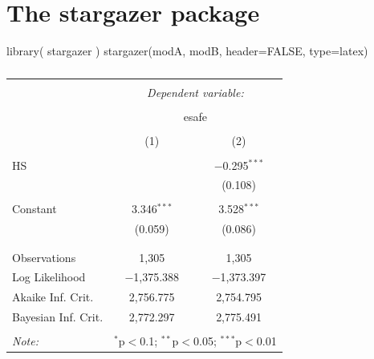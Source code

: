 \documentclass[
  letterpaper,
  DIV=11,
  numbers=noendperiod]{scrreprt}
\newenvironment{Shaded}{\begin{snugshade}}{\end{snugshade}}
\newcommand{\AttributeTok}[1]{\textcolor[rgb]{0.49,0.56,0.16}{#1}}
\newcommand{\ConstantTok}[1]{\textcolor[rgb]{0.53,0.00,0.00}{#1}}
\newcommand{\FunctionTok}[1]{\textcolor[rgb]{0.02,0.16,0.49}{#1}}
\newcommand{\NormalTok}[1]{\textcolor[rgb]{0.00,0.44,0.13}{#1}}
\newcommand{\StringTok}[1]{\textcolor[rgb]{0.25,0.44,0.63}{#1}}
\begin{document}
\hypertarget{the-stargazer-package}{%
\section{The stargazer package}\label{the-stargazer-package}}

\begin{Shaded}
\begin{Highlighting}[]
\FunctionTok{library}\NormalTok{( stargazer )}
\FunctionTok{stargazer}\NormalTok{(modA, modB, }\AttributeTok{header=}\ConstantTok{FALSE}\NormalTok{, }\AttributeTok{type=}\StringTok{\textquotesingle{}latex\textquotesingle{}}\NormalTok{)}
\end{Highlighting}
\end{Shaded}

\begin{table}[!htbp] \centering 
  \caption{} 
  \label{} 
\begin{tabular}{@{\extracolsep{5pt}}lcc} 
\\[-1.8ex]\hline 
\hline \\[-1.8ex] 
 & \multicolumn{2}{c}{\textit{Dependent variable:}} \\ 
\cline{2-3} 
\\[-1.8ex] & \multicolumn{2}{c}{esafe} \\ 
\\[-1.8ex] & (1) & (2)\\ 
\hline \\[-1.8ex] 
 HS &  & $-$0.295$^{***}$ \\ 
  &  & (0.108) \\ 
  & & \\ 
 Constant & 3.346$^{***}$ & 3.528$^{***}$ \\ 
  & (0.059) & (0.086) \\ 
  & & \\ 
\hline \\[-1.8ex] 
Observations & 1,305 & 1,305 \\ 
Log Likelihood & $-$1,375.388 & $-$1,373.397 \\ 
Akaike Inf. Crit. & 2,756.775 & 2,754.795 \\ 
Bayesian Inf. Crit. & 2,772.297 & 2,775.491 \\ 
\hline 
\hline \\[-1.8ex] 
\textit{Note:}  & \multicolumn{2}{r}{$^{*}$p$<$0.1; $^{**}$p$<$0.05; $^{***}$p$<$0.01} \\ 
\end{tabular} 
\end{table}
\end{document}
